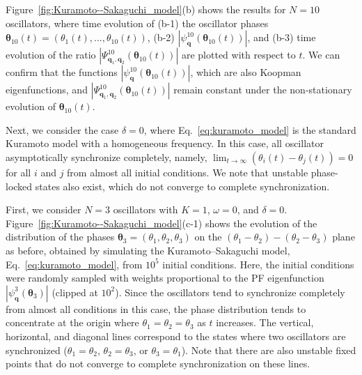 \documentclass[
amsmath,amssymb,
]{revtex4-2}
\begin{document}
Figure~\ref{fig:Kuramoto--Sakaguchi_model}(b) shows the results for $N=10$ oscillators, where
time evolution of (b-1) the oscillator phases ${\bm \theta}_{10}(t) = (\theta_1(t), ..., \theta_{10}(t))$,
(b-2) $\left|\psi^{10}_{\bm{q}}({\bm \theta}_{10}(t))\right|$, and (b-3) time evolution of the ratio $\left|\Psi^{10}_{\bm{q}_1,\bm{q}_2}({\bm \theta}_{10}(t))\right|$
are plotted with respect to $t$.
%
We can confirm that the functions $\left|\psi^{10}_{\bm{q}}({\bm \theta}_{10}(t))\right|$,
which are also Koopman eigenfunctions, and $\left|\Psi^{10}_{\bm{q}_1,\bm{q}_2}({\bm \theta}_{10}(t))\right|$ remain constant under the non-stationary evolution of ${\bm \theta}_{10}(t)$.
%

%
Next, we consider the case $\delta = 0$, where Eq.~\eqref{eq:kuramoto_model} is the standard Kuramoto model with a homogeneous frequency. 
In this case, all oscillator asymptotically synchronize completely, namely, $\lim_{t \to \infty} ( \theta_i(t) - \theta_j(t) ) = 0$ for all $i$ and $j$ from almost all initial conditions.
We note that unstable phase-locked states also exist, which do not converge to complete synchronization.


First, we consider $N=3$ oscillators with $K = 1$, $\omega = 0$, and $\delta = 0$.
%
Figure~\ref{fig:Kuramoto--Sakaguchi_model}(c-1) shows
the evolution of the distribution of the phases ${\bm \theta}_3 = (\theta_1, \theta_2, \theta_3)$ on the $(\theta_1-\theta_2) - (\theta_2-\theta_3)$ plane as before, obtained by simulating the Kuramoto--Sakaguchi model, Eq.~\eqref{eq:kuramoto_model}, from $10^5$ initial conditions. Here, the initial conditions were randomly sampled with weights proportional to the PF eigenfunction $\left|\psi^3_{\bm{q}}({\bm \theta}_3)\right|$ (clipped at $10^2$).
%
Since the oscillators tend to synchronize completely from almost all conditions in this case, the phase distribution tends to concentrate at the origin where $\theta_1 = \theta_2 = \theta_3$ as $t$ increases. 
%
The vertical, horizontal, and diagonal lines correspond to the states where 
two oscillators are synchronized ($\theta_1 = \theta_2$, $\theta_2 = \theta_3$, or $\theta_3 = \theta_1$). Note that there are also unstable fixed points that do not converge to complete synchronization on these lines.
 
\end{document}

